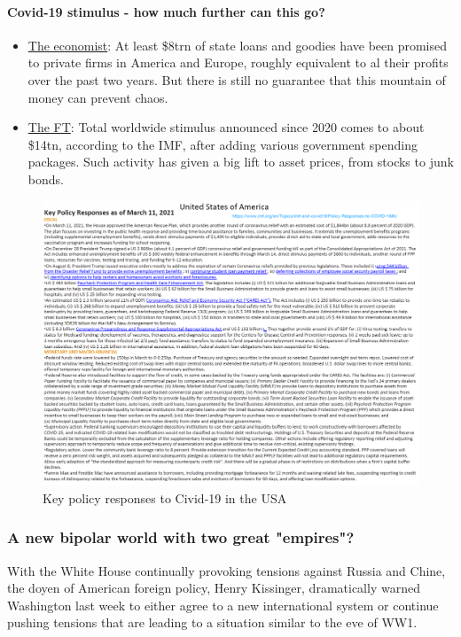 \paragraph{Covid-19 stimulus - how much further can this go?}

\begin{itemize}
    \item \underline{The economist}: At least \$8trn of state loans and
        goodies have been promised to private firms in America and Europe,
        roughly equivalent to al their profits over the past two years. But
        there is still no guarantee that this mountain of money can prevent
        chaos.
    \item \underline{The FT}: Total worldwide stimulus announced since 2020
        comes to about \$14tn, according to the IMF, after adding various
        government spending packages. Such activity has given a big lift
        to asset prices, from stocks to junk bonds.
\end{itemize}

\begin{figure}[h]
    \centering
    \includegraphics[width=\textwidth]{Pictures/Covid_USA.png}
    \caption{Key policy responses to Civid-19 in the USA}
\end{figure}


\subsubsection{A new bipolar world with two great "empires"?}

With the White House continually provoking tensions against Russia and Chine,
the doyen of American foreign policy, Henry Kissinger, dramatically warned
Washington last week to either agree to a new international system or continue
pushing tensions that are leading to a situation similar to the eve of WW1.

